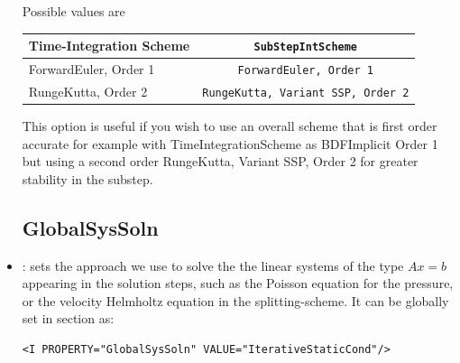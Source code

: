 \begin{itemize}
Possible values are
\begin{center}
\footnotesize
\begin{tabular}{lc}
\toprule
{Time-Integration Scheme} & \texttt{SubStepIntScheme} \\
\midrule
ForwardEuler, Order 1 & \texttt{ForwardEuler, Order 1}  \\
RungeKutta, Order 2 & \texttt{RungeKutta, Variant SSP, Order 2}  \\
\bottomrule
\end{tabular}
\end{center}

This option is useful if you wish to use an overall scheme that is
first order accurate for example with TimeIntegrationScheme as
BDFImplicit Order 1 but using a second order RungeKutta, Variant SSP,
Order 2 for greater stability in the substep.

\subsection{GlobalSysSoln}

\item {}: sets the approach we use to solve the the linear
systems of the type $Ax=b$ appearing in the solution steps, such as the Poisson
equation for the pressure, or the velocity Helmholtz equation in the splitting-scheme. It can be globally set in section  as:
%
\begin{lstlisting}[style=XMLStyle]
<I PROPERTY="GlobalSysSoln" VALUE="IterativeStaticCond"/>
\end{lstlisting}


\end{itemize}
